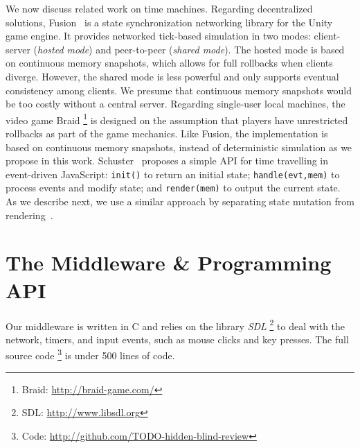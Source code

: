 \documentclass[sn-mathphys,iicol]{sn-jnl}%
\newcommand{\code}[1]  {\texttt{\small{#1}}}
\begin{document}
We now discuss related work on time machines.
%
Regarding decentralized solutions, Fusion~\cite{fusion} is a state
synchronization networking library for the Unity game engine.
It provides networked tick-based simulation in two modes: client-server
(\emph{hosted mode}) and peer-to-peer (\emph{shared mode}).
The hosted mode is based on continuous memory snapshots, which allows for
full rollbacks when clients diverge.
However, the shared mode is less powerful and only supports eventual
consistency among clients.
We presume that continuous memory snapshots would be too costly without a
central server.
%
Regarding single-user local machines, the video game Braid%
\footnote{Braid: \url{http://braid-game.com/}}
is designed on the assumption that players have unrestricted rollbacks as part
of the game mechanics.
Like Fusion, the implementation is based on continuous memory snapshots,
instead of deterministic simulation as we propose in this work.
%
Schuster~\cite{tml.js} proposes a simple API for time travelling in
event-driven JavaScript:
    \code{init()} to return an initial state;
    \code{handle(evt,mem)} to process events and modify state; and
    \code{render(mem)} to output the current state.
As we describe next, we use a similar approach by separating state mutation
from rendering~\cite{tml.alive}.

\section{The Middleware \& Programming API}
\label{sec.tml}

Our middleware is written in C and relies on the library \emph{SDL}%
\footnote{SDL: \url{http://www.libsdl.org}}
to deal with the network, timers, and input events, such as mouse clicks and
key presses.
The full source code%
\footnote{Code: \url{http://github.com/TODO-hidden-blind-review}}
is under 500 lines of code.
\end{document}
